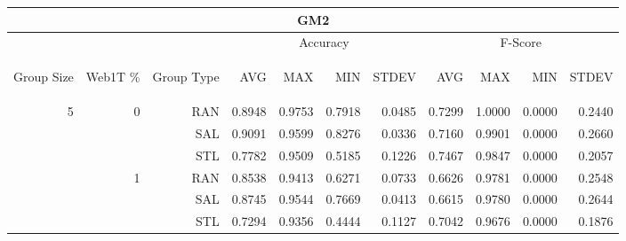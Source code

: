 \begin{center}
\begin{table}[htbp] 
 \begin{center}
\begin{tabular}{ | r | r | r | r | r | r | r | r | r | r | r |}
\hline
\multicolumn{11}{|c|}{GM2}\\
\hline
 & & & \multicolumn{4}{|c|}{Accuracy} & \multicolumn{4}{|c|}{F-Score}\\ \cline{4-11}
\begin{sideways}Group Size\end{sideways} & \begin{sideways}Web1T \%\end{sideways} & \begin{sideways}Group Type\end{sideways} & \begin{sideways}AVG\end{sideways} & \begin{sideways}MAX\end{sideways} & \begin{sideways}MIN\end{sideways} & \begin{sideways}STDEV\end{sideways} & \begin{sideways}AVG\end{sideways} & \begin{sideways}MAX\end{sideways} & \begin{sideways}MIN\end{sideways} & \begin{sideways}STDEV\end{sideways}\\
\hline
\multirow{18}{*}{5}
 & \multirow{3}{*}{0} & RAN & 0.8948 & 0.9753 & 0.7918 & 0.0485 & 0.7299 & 1.0000 & 0.0000 & 0.2440\\ \cline{3-11}
 &   & SAL & 0.9091 & 0.9599 & 0.8276 & 0.0336 & 0.7160 & 0.9901 & 0.0000 & 0.2660\\ \cline{3-11}
 &   & STL & 0.7782 & 0.9509 & 0.5185 & 0.1226 & 0.7467 & 0.9847 & 0.0000 & 0.2057\\ \cline{2-11}
 & \multirow{3}{*}{1} & RAN & 0.8538 & 0.9413 & 0.6271 & 0.0733 & 0.6626 & 0.9781 & 0.0000 & 0.2548\\ \cline{3-11}
 &   & SAL & 0.8745 & 0.9544 & 0.7669 & 0.0413 & 0.6615 & 0.9780 & 0.0000 & 0.2644\\ \cline{3-11}
 &   & STL & 0.7294 & 0.9356 & 0.4444 & 0.1127 & 0.7042 & 0.9676 & 0.0000 & 0.1876\\ \cline{2-11}

\end{tabular}
\end{center}
\end{table}
\end{center}
